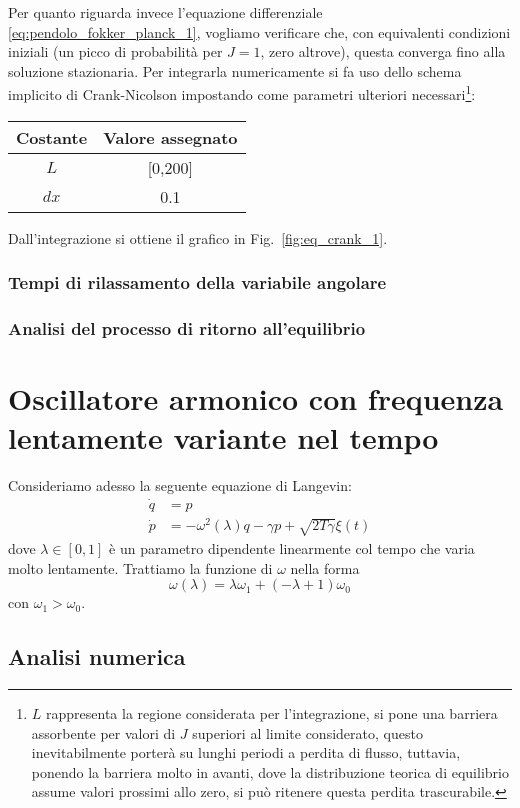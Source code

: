 \documentclass[10pt,a4paper]{article}
\begin{document}
Per quanto riguarda invece l'equazione differenziale \eqref{eq:pendolo_fokker_planck_1}, vogliamo verificare che, con equivalenti condizioni iniziali (un picco di probabilità per \(J=1\), zero altrove), questa converga fino alla soluzione stazionaria. Per integrarla numericamente si fa uso dello schema implicito di Crank-Nicolson impostando come parametri ulteriori necessari\footnote{\(L\) rappresenta la regione considerata per l'integrazione, si pone una barriera assorbente per valori di \(J\) superiori al limite considerato, questo inevitabilmente porterà su lunghi periodi a perdita di flusso, tuttavia, ponendo la barriera molto in avanti, dove la distribuzione teorica di equilibrio assume valori prossimi allo zero, si può ritenere questa perdita trascurabile.}:
\begin{center}
	\begin{tabular}{cc}
	\toprule
	Costante & {Valore assegnato} \\
	\midrule
	$L$			& [0,200]	\\
	$dx$		& 0.1	\\
	\bottomrule
	\end{tabular}
	\label{tab:valori_2}
\end{center}
Dall'integrazione si ottiene il grafico in Fig.~\ref{fig:eq_crank_1}.



\subsubsection{Tempi di rilassamento della variabile angolare}

\subsubsection{Analisi del processo di ritorno all'equilibrio}



\section{Oscillatore armonico con frequenza lentamente variante nel tempo}

Consideriamo adesso la seguente equazione di Langevin:
\begin{align}
	\dot{q} &= p \\
	\dot{p} &= -\omega^2(\lambda)q - \gamma p + \sqrt{2T\gamma} \xi(t)
\end{align}
dove \(\lambda\in[0,1]\) è un parametro dipendente linearmente col tempo che varia molto lentamente. Trattiamo la funzione di \(\omega\) nella forma
\begin{equation}
 	\omega (\lambda) = \lambda \omega_1 + (-\lambda + 1) \omega_0
\end{equation} 
con \(\omega_1 > \omega_0\).

\subsection{Analisi numerica}
\end{document}
